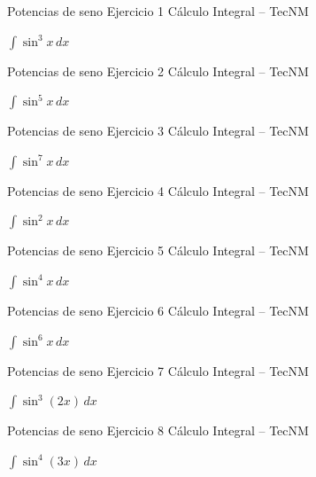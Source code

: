 \documentclass[aspectratio=169,12pt]{beamer}
\newcommand{\ejercicio}[1]{%
  \begin{center}
  \vfill
  {\fontsize{24}{30}\selectfont #1}
  \vfill
  \end{center}
}
\begin{document}
\begin{frame}{Potencias de seno}
\small Ejercicio 1 \hfill Cálculo Integral -- TecNM
\ejercicio{$\displaystyle \int \sin^3 x\,dx$}
\end{frame}
\begin{frame}{Potencias de seno}
\small Ejercicio 2 \hfill Cálculo Integral -- TecNM
\ejercicio{$\displaystyle \int \sin^5 x\,dx$}
\end{frame}
\begin{frame}{Potencias de seno}
\small Ejercicio 3 \hfill Cálculo Integral -- TecNM
\ejercicio{$\displaystyle \int \sin^7 x\,dx$}
\end{frame}
\begin{frame}{Potencias de seno}
\small Ejercicio 4 \hfill Cálculo Integral -- TecNM
\ejercicio{$\displaystyle \int \sin^2 x\,dx$}
\end{frame}
\begin{frame}{Potencias de seno}
\small Ejercicio 5 \hfill Cálculo Integral -- TecNM
\ejercicio{$\displaystyle \int \sin^4 x\,dx$}
\end{frame}
\begin{frame}{Potencias de seno}
\small Ejercicio 6 \hfill Cálculo Integral -- TecNM
\ejercicio{$\displaystyle \int \sin^6 x\,dx$}
\end{frame}
\begin{frame}{Potencias de seno}
\small Ejercicio 7 \hfill Cálculo Integral -- TecNM
\ejercicio{$\displaystyle \int \sin^3(2x)\,dx$}
\end{frame}
\begin{frame}{Potencias de seno}
\small Ejercicio 8 \hfill Cálculo Integral -- TecNM
\ejercicio{$\displaystyle \int \sin^4(3x)\,dx$}
\end{frame}
\end{document}
